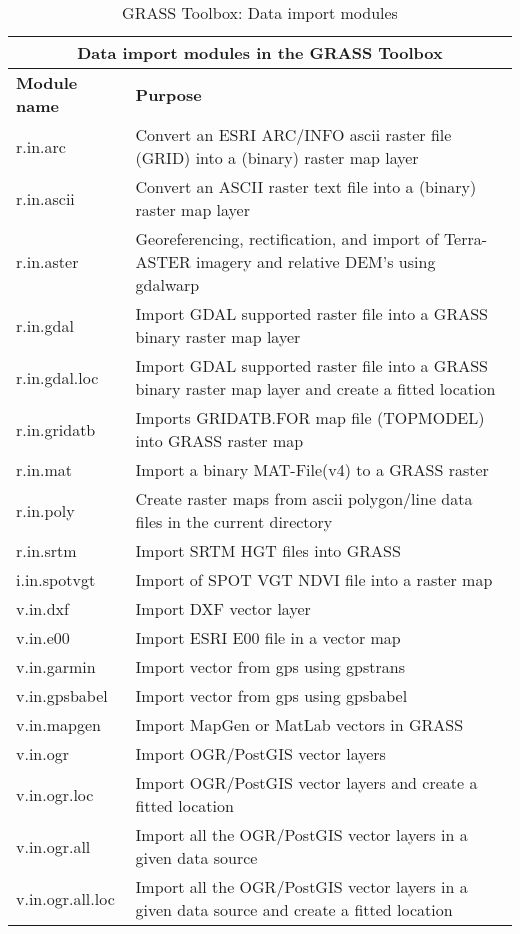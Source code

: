 \begin{table}[ht]
\centering
\caption{GRASS Toolbox: Data import modules}\medskip
 \begin{tabular}{|p{4cm}|p{12cm}|}
  \hline \multicolumn{2}{|c|}{\textbf{Data import modules in the GRASS
  Toolbox}} \\ 
  \hline \textbf{Module name} & \textbf{Purpose} \\
  \hline r.in.arc & Convert an ESRI ARC/INFO ascii raster file (GRID) into a
  (binary) raster map layer\\
  \hline r.in.ascii & Convert an ASCII raster text file into a (binary)
  raster map layer \\
  \hline r.in.aster & Georeferencing, rectification, and import of
  Terra-ASTER imagery and relative DEM's using gdalwarp \\
  \hline r.in.gdal &  Import GDAL supported raster file into a GRASS binary
  raster map layer \\
  \hline r.in.gdal.loc &  Import GDAL supported raster file into a GRASS
  binary raster map layer and create a fitted location \\
  \hline r.in.gridatb & Imports GRIDATB.FOR map file (TOPMODEL) into GRASS
  raster map \\
  \hline r.in.mat  & Import a binary MAT-File(v4) to a GRASS raster  \\
  \hline r.in.poly  &  Create raster maps from ascii polygon/line data files
  in the current directory \\
  \hline r.in.srtm  & Import SRTM HGT files into GRASS \\
  \hline i.in.spotvgt & Import of SPOT VGT NDVI file into a raster map \\
  \hline v.in.dxf & Import DXF vector layer \\
  \hline v.in.e00 & Import ESRI E00 file in a vector map \\
  \hline v.in.garmin & Import vector from gps using gpstrans \\
  \hline v.in.gpsbabel & Import vector from gps using gpsbabel \\
  \hline v.in.mapgen & Import MapGen or MatLab vectors in GRASS \\
  \hline v.in.ogr & Import OGR/PostGIS vector layers \\
  \hline v.in.ogr.loc & Import OGR/PostGIS vector layers and create a fitted
  location\\
  \hline v.in.ogr.all & Import all the OGR/PostGIS vector layers in a given
  data source \\
  \hline v.in.ogr.all.loc & Import all the OGR/PostGIS vector layers in a
  given data source and create a fitted location \\
\hline
\end{tabular}
\end{table}

